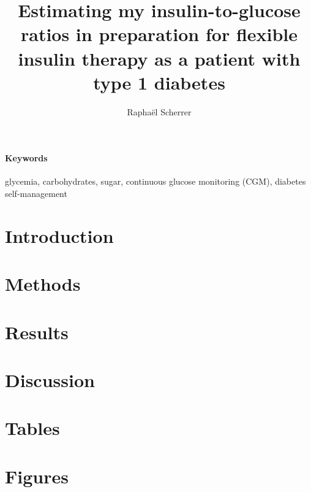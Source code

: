 \documentclass[]{article}
\title{Estimating my insulin-to-glucose ratios in preparation for flexible insulin therapy as a patient with type 1 diabetes}
\author{Rapha\"{e}l Scherrer}
\date{}
\begin{document}
\maketitle

\begin{abstract}
	


\end{abstract}

\paragraph{Keywords} glycemia, carbohydrates, sugar, continuous glucose monitoring (CGM), diabetes self-management

\pagebreak

\section*{Introduction}



\pagebreak

\section*{Methods}



\pagebreak

\section*{Results}



\pagebreak

\section*{Discussion}



\pagebreak

\section*{Tables}



\pagebreak

\section*{Figures}


\end{document}
